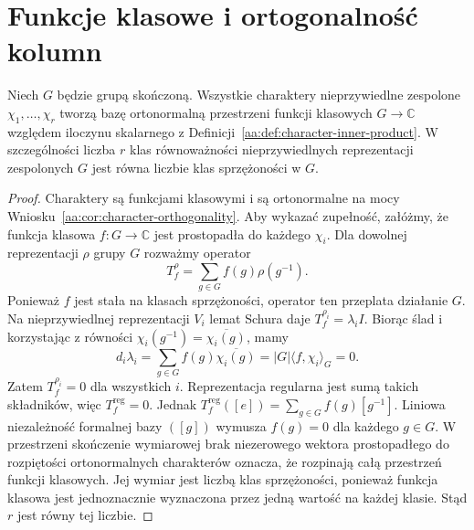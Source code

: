 \section{Funkcje klasowe i ortogonalność kolumn}
\begin{twierdzenie}
\label{aa:tw:characters-basis}
Niech \(G\) będzie grupą skończoną.
Wszystkie charaktery nieprzywiedlne zespolone
\(\chi_1,\ldots,\chi_r\) tworzą bazę ortonormalną
przestrzeni funkcji klasowych \(G\to\mathbb C\)
względem iloczynu skalarnego
z Definicji~\ref{aa:def:character-inner-product}.
W szczególności liczba \(r\) klas równoważności
nieprzywiedlnych reprezentacji zespolonych \(G\)
jest równa liczbie klas sprzężoności w \(G\).
\end{twierdzenie}
\begin{proof}
Charaktery są funkcjami klasowymi i są ortonormalne
na mocy Wniosku~\ref{aa:cor:character-orthogonality}.
Aby wykazać zupełność, załóżmy, że funkcja klasowa
\(f:G\to\mathbb C\) jest prostopadła do każdego
\(\chi_i\). Dla dowolnej reprezentacji \(\rho\)
grupy \(G\) rozważmy operator
\[
T_f^\rho=\sum_{g\in G}f(g)\rho(g^{-1}).
\]
Ponieważ \(f\) jest stała na klasach sprzężoności,
operator ten przeplata działanie \(G\).
Na nieprzywiedlnej reprezentacji \(V_i\)
lemat Schura daje \(T_f^{\rho_i}=\lambda_iI\).
Biorąc ślad i korzystając z równości
\(\chi_i(g^{-1})=\overline{\chi_i(g)}\), mamy
\[
d_i\lambda_i=\sum_{g\in G}
f(g)\overline{\chi_i(g)}
=|G|\langle f,\chi_i\rangle_G=0.
\]
Zatem \(T_f^{\rho_i}=0\) dla wszystkich \(i\).
Reprezentacja regularna jest sumą takich składników,
więc \(T_f^{\mathrm{reg}}=0\). Jednak
\(T_f^{\mathrm{reg}}([e])
=\sum_{g\in G}f(g)[g^{-1}]\).
Liniowa niezależność formalnej bazy \(([g])\)
wymusza \(f(g)=0\) dla każdego \(g\in G\).
W przestrzeni skończenie wymiarowej brak
niezerowego wektora prostopadłego do rozpiętości
ortonormalnych charakterów oznacza, że rozpinają
całą przestrzeń funkcji klasowych.
Jej wymiar jest liczbą klas sprzężoności, ponieważ
funkcja klasowa jest jednoznacznie wyznaczona przez
jedną wartość na każdej klasie. Stąd \(r\) jest równy
tej liczbie.
\end{proof}

